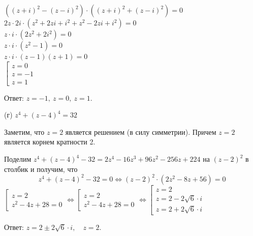 \documentclass[]{book}
\theoremstyle{definition}
\begin{document}
\begin{enumerate}[resume]
$\left((z+i)^2 - (z-i)^2\right)\cdot\left((z+i)^2 + (z-i)^2\right) = 0$\\
$2z\cdot2i\cdot\left( z^2 + 2zi + i^2 + z^2 - 2zi + i^2\right) = 0$\\
$z\cdot i\cdot\left( 2z^2 + 2i^2\right) = 0$\\
$z\cdot i\cdot\left(z^2 - 1\right) = 0$\\
$z\cdot i\cdot(z - 1)(z + 1) = 0$\\
$
\left[
\begin{gathered}
z = 0 \\
z = -1\\ 
z = 1
\end{gathered}
\right.
$

Ответ: $z = -1, \: z = 0,\: z = 1$.

(г) $z^4 + (z -4)^4 = 32$

Заметим, что $z = 2$ является решением (в силу симметрии). Причем $z = 2$ является корнем кратности 2.

Поделим $z^4 + (z - 4)^4 - 32 = 2z^4 - 16z^3 + 96z^2 - 256z + 224 $ на $(z-2)^2$ в столбик и получим, что
$$z^4 + (z - 4)^2 - 32 = 0 \Longleftrightarrow (z - 2)^2\cdot (2z^2 - 8z + 56) = 0 $$
$
\left[
\begin{gathered}
z = 2 \\
z^2 - 4z + 28 = 0
\end{gathered}
\right.
\Longleftrightarrow
\left[
\begin{gathered}
z = 2 \\
z^2 - 4z + 28 = 0
\end{gathered}
\right.
\Longleftrightarrow
\left[
\begin{gathered}
z = 2 \\
z = 2 - 2\sqrt{6}\cdot i \\
z = 2 + 2\sqrt{6}\cdot i
\end{gathered}
\right.
$

Ответ: $z = 2 \pm2\sqrt{6}\cdot i,\quad z = 2$.






\end{enumerate}
\end{document}
